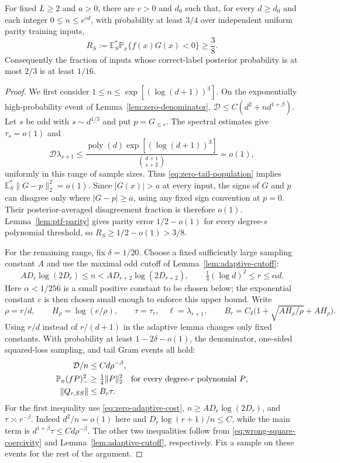 \begin{theorem}\label{thm:zero-endpoint}
For fixed $L\ge2$ and $a>0$, there are $c>0$ and $d_0$ such that, for
every $d\ge d_0$ and each integer $0\le n\le e^{cd}$, with probability
at least $3/4$ over independent uniform parity training inputs,
\[
 R_S:=\mathbb E_S^*\mathbb P_x\{f(x)G(x)<0\}\ge\frac38.
\]
Consequently the fraction of inputs whose correct-label posterior
probability is at most $2/3$ is at least $1/16$.
\end{theorem}
\begin{proof}
We first consider $1\le n\le\exp[(\log(d+1))^3]$.
On the exponentially high-probability event of
Lemma~\ref{lem:zero-denominator},
$\mathcal D\le C(d^2+nd^{1+\beta})$.
Let $s$ be odd with $s\sim d^{1/3}$ and put $p=G_{\le s}$.
The spectral estimates give $\tau_s=o(1)$ and
\[
 \mathcal D\lambda_{s+1}
 \le \frac{\operatorname{poly}(d)\exp[(\log(d+1))^3]}
                {\binom{d+1}{s+2}}=o(1),
\]
uniformly in this range of sample sizes. Thus
\eqref{eq:zero-tail-population} implies
$\mathbb E_S^*\|G-p\|_2^2=o(1)$.
Since $|G(x)|>a$ at every input, the signs of $G$ and $p$ can disagree
only where $|G-p|\ge a$, using any fixed sign convention at $p=0$.
Their posterior-averaged disagreement fraction is therefore $o(1)$.
Lemma~\ref{lem:ptf-parity} gives parity error $1/2-o(1)$ for every
degree-$s$ polynomial threshold, so $R_S\ge1/2-o(1)>3/8$.

For the remaining range, fix $\delta=1/20$. Choose a fixed sufficiently
large sampling constant $A$ and use the maximal odd cutoff of
Lemma~\ref{lem:adaptive-cutoff}:
\[
 A D_r\log(2D_r)\le n<A D_{r+2}\log(2D_{r+2}),
 \qquad \tfrac14(\log d)^2\le r\le\alpha d.
\]
Here $\alpha<1/256$ is a small positive constant to be chosen below;
the exponential constant $c$ is then chosen small enough to enforce
this upper bound. Write
\[
 \rho=r/d,\qquad H_\rho=\log(e/\rho),\qquad
 \tau=\tau_r,\quad\ell=\lambda_{r+1},\qquad
 B_r=C_\delta\bigl(1+\sqrt{A H_\rho/\rho}+A H_\rho\bigr).
\]
Using $r/d$ instead of $r/(d+1)$ in the adaptive lemma changes only
fixed constants.
With probability at least $1-2\delta-o(1)$, the denominator,
one-sided squared-loss sampling, and tail Gram events all hold:
\begin{align}
 \mathcal D/n&\le C d\rho^{-\beta},
 \label{eq:zero-normalized-cost}\\
 \mathbb P_n(fP)_-^2&\ge\tfrac14\|P\|_2^2
       \quad\hbox{for every degree-$r$ polynomial $P$},
 \label{eq:zero-coercivity}\\
 \|Q_{r,SS}\|&\le B_r\tau.
 \label{eq:zero-gram}
\end{align}
For the first inequality use \eqref{eq:zero-adaptive-cost},
$n\ge A D_r\log(2D_r)$, and $\tau\asymp r^{-\beta}$.
Indeed $d^2/n=o(1)$ here and
$D_r\log(r+1)/n\le C$, while the main term is
$d^{1+\beta}\tau\le C d\rho^{-\beta}$.
The other two inequalities follow from
\eqref{eq:wrong-square-coercivity} and
Lemma~\ref{lem:adaptive-cutoff}, respectively. Fix a sample on these
events for the rest of the argument.


\end{proof}
